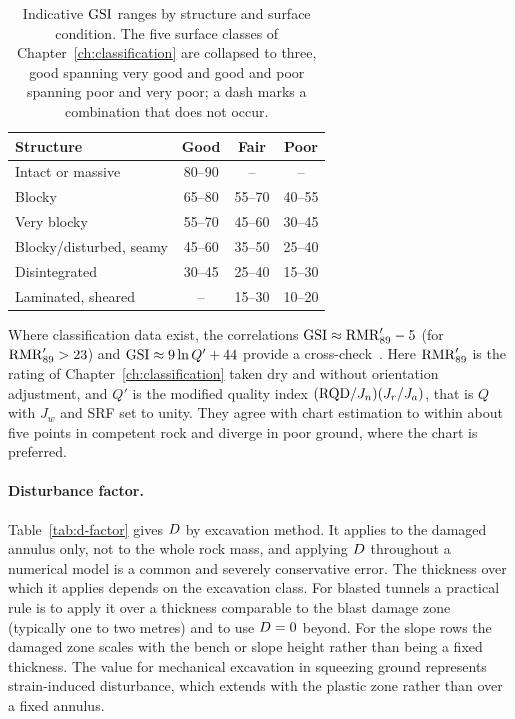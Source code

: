 \begin{table}[htbp]
\caption{Indicative $\mathrm{GSI}$ ranges by structure and surface condition. The five surface classes of Chapter~\ref{ch:classification} are collapsed to three, good spanning very good and good and poor spanning poor and very poor; a dash marks a combination that does not occur.}
\label{tab:gsi}
\centering
\small
\begin{tabularx}{\textwidth}{X c c c}
\toprule
\textbf{Structure} & \textbf{Good} & \textbf{Fair} & \textbf{Poor} \\
\midrule
Intact or massive        & 80--90 & --     & --     \\
Blocky                   & 65--80 & 55--70 & 40--55 \\
Very blocky              & 55--70 & 45--60 & 30--45 \\
Blocky/disturbed, seamy  & 45--60 & 35--50 & 25--40 \\
Disintegrated            & 30--45 & 25--40 & 15--30 \\
Laminated, sheared       & --     & 15--30 & 10--20 \\
\bottomrule
\end{tabularx}
\end{table}

Where classification data exist, the correlations
$\mathrm{GSI} \approx \mathrm{RMR}'_{89} - 5$ (for $\mathrm{RMR}'_{89} > 23$) and
$\mathrm{GSI} \approx 9\ln Q' + 44$ provide a cross-check~\citep{hoek1995support}. Here $\mathrm{RMR}'_{89}$ is the
rating of Chapter~\ref{ch:classification} taken dry and without orientation
adjustment, and $Q'$ is the modified quality index
$(\mathrm{RQD}/J_n)(J_r/J_a)$, that is $Q$ with $J_w$ and SRF set to unity. They agree with chart
estimation to within about five points in competent rock and diverge in poor
ground, where the chart is preferred.

\paragraph{Disturbance factor.}
Table~\ref{tab:d-factor} gives $D$ by excavation method. It applies to the
damaged annulus only, not to the whole rock mass, and applying $D$
throughout a numerical model is a common and severely conservative error. The
thickness over which it applies depends on the excavation class. For blasted
tunnels a practical rule is to apply it over a thickness comparable to the
blast damage zone (typically one to two metres) and to use $D = 0$
beyond. For the slope rows the damaged zone scales with the bench or slope
height rather than being a fixed thickness. The value for mechanical
excavation in squeezing ground represents strain-induced disturbance, which
extends with the plastic zone rather than over a fixed annulus.

